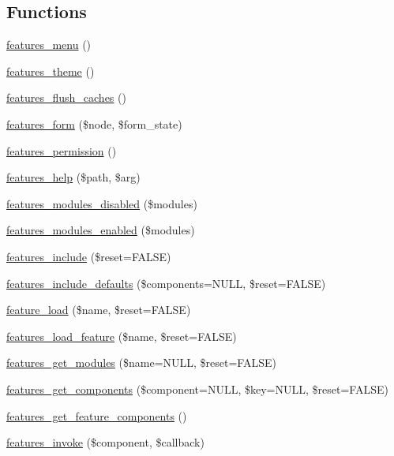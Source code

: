 \subsection*{Functions}
\begin{DoxyCompactItemize}
\item 
\hyperlink{features_8module_a2f3b3fc6d67373f91feb6e2e9d45c0f0}{features\_\-menu} ()
\item 
\hyperlink{features_8module_aa4bc5c89bc3ae19889dc444bf408608d}{features\_\-theme} ()
\item 
\hyperlink{features_8module_a11ac8740ad0c9745b94a37e7da421d2b}{features\_\-flush\_\-caches} ()
\item 
\hyperlink{features_8module_a6a4b2e2f866538b3c0c7d950aea3f80f}{features\_\-form} (\$node, \$form\_\-state)
\item 
\hyperlink{features_8module_a8798acbb3fe11426ba45f33a83e055b6}{features\_\-permission} ()
\item 
\hyperlink{features_8module_abc18f3557bf3118b00e725fe283259ab}{features\_\-help} (\$path, \$arg)
\item 
\hyperlink{features_8module_ab4015ad6546e314fe3e6e8ed0d436c05}{features\_\-modules\_\-disabled} (\$modules)
\item 
\hyperlink{features_8module_a124f4a6b7d4a6678f703597bad15f6d7}{features\_\-modules\_\-enabled} (\$modules)
\item 
\hyperlink{features_8module_aa808105e0eafb3744d0cdcfe50802456}{features\_\-include} (\$reset=FALSE)
\item 
\hyperlink{features_8module_a359c52c08e57a3bdd13594abd116543e}{features\_\-include\_\-defaults} (\$components=NULL, \$reset=FALSE)
\item 
\hyperlink{features_8module_ac4d9735b1a5fade78f7e1ac2a8115196}{feature\_\-load} (\$name, \$reset=FALSE)
\item 
\hyperlink{features_8module_abbc16356d1df3bc150b0bd56d35b00f8}{features\_\-load\_\-feature} (\$name, \$reset=FALSE)
\item 
\hyperlink{features_8module_a878b29e09c069a8be511070bbfedfaf9}{features\_\-get\_\-modules} (\$name=NULL, \$reset=FALSE)
\item 
\hyperlink{features_8module_a4b2d2e6aaa5c36d781cdda657285ee12}{features\_\-get\_\-components} (\$component=NULL, \$key=NULL, \$reset=FALSE)
\item 
\hyperlink{features_8module_a714c640c4e8c11ee30eacc1510415598}{features\_\-get\_\-feature\_\-components} ()
\item 
\hyperlink{features_8module_a0bcd406d15618a70e5be91e70d5d9d05}{features\_\-invoke} (\$component, \$callback)

\end{DoxyCompactItemize}
